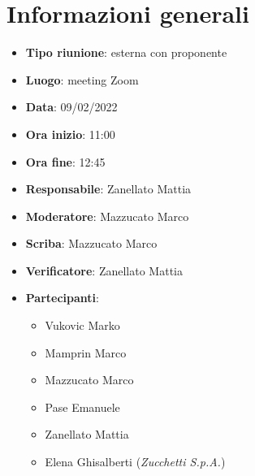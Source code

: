 \section{Informazioni generali}
\begin{itemize}
  \item \textbf{Tipo riunione}: esterna con proponente
  \item \textbf{Luogo}: meeting Zoom
  \item \textbf{Data}: 09/02/2022
  \item \textbf{Ora inizio}: 11:00
  \item \textbf{Ora fine}: 12:45
  \item \textbf{Responsabile}: Zanellato Mattia
  \item \textbf{Moderatore}: Mazzucato Marco
  \item \textbf{Scriba}: Mazzucato Marco
  \item \textbf{Verificatore}: Zanellato Mattia
  \item \textbf{Partecipanti}:
  \begin{itemize}
    \item Vukovic Marko
    \item Mamprin Marco
    \item Mazzucato Marco
    \item Pase Emanuele
    \item Zanellato Mattia
    \item Elena Ghisalberti (\textit{Zucchetti S.p.A.})
  \end{itemize}
\end{itemize}
